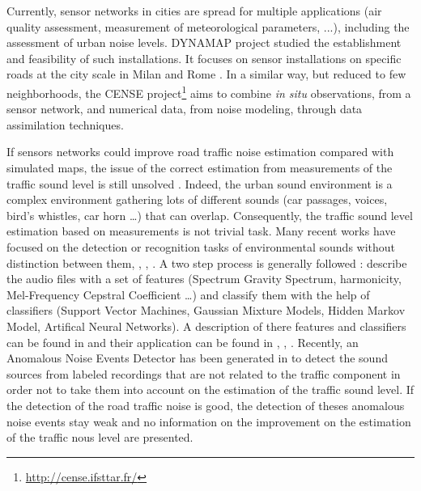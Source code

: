 \documentclass[twocolumn,a4paper,10pt]{article}
\begin{document}

Currently, sensor networks in cities are spread for multiple applications (air quality assessment, measurement of meteorological parameters, ...), including the assessment of urban noise levels. DYNAMAP project \cite{dynamap_2016} studied the establishment and feasibility of such installations. It focuses on sensor installations on specific roads at the city scale in Milan and Rome \cite{bellucci_life_2017}. In a similar way, but reduced to few neighborhoods, the CENSE project\footnote{\url{http://cense.ifsttar.fr/}} \cite{} aims to combine \textit{in situ} observations, from a sensor network, and numerical data, from noise modeling, through data assimilation techniques.

If sensors networks could improve road traffic noise estimation compared with simulated maps, the issue of the correct estimation from  measurements of the traffic sound level is still unsolved \cite{Mioduszewski}. Indeed, the urban sound environment is a complex environment gathering lots of different sounds (car passages, voices, bird's whistles, car horn \dots) that can overlap. Consequently, the traffic sound level estimation based on measurements is not trivial task.
Many recent works have focused on the detection or recognition tasks of environmental sounds without distinction between them\cite{heittola_sound_2011}, \cite{defreville_automatic_2006}, \cite{dufaux_automatic_2000}, \cite{chu_environmental_2009}. A two step process is generally followed : describe the audio files with a set of features (Spectrum Gravity Spectrum, harmonicity, Mel-Frequency Cepstral Coefficient \dots) and classify them with the help of classifiers (Support Vector Machines, Gaussian Mixture Models, Hidden Markov Model, Artifical Neural Networks). A description of there features and classifiers can be found in \cite{cowling_comparison_2003} and their application can be found in \cite{shen_environmental_2012}, \cite{beritelli_pattern_2008}, \cite{couvreur_automatic_2004}. Recently, an Anomalous Noise Events Detector has been generated in \cite{socoro_anomalous_2017} to detect the sound sources from labeled recordings that are not related to the traffic component in order not to take them into account on the estimation of the traffic sound level. If the detection of the road traffic noise is good, the detection of theses anomalous noise events stay weak and no information on the improvement on the estimation of the traffic nous level are presented.
\end{document}
